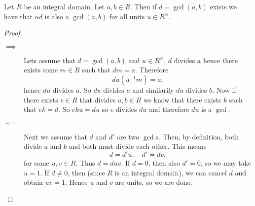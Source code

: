 \begin{lemma}
    Let $R$ be an integral domain. Let $a, b \in R$. Then if $d = \gcd{(a, b)}$ exists we have that $ud$ is also a $\gcd{(a, b)}$ for all units $u \in R^\times$.
\end{lemma}

\begin{proof}
    \begin{description}
        \item[$\implies$] Lets assume that $d = \gcd(a, b)$ and $u \in R^{\times}$. $d$ divides $a$ hence there exists some $m \in R$ such that $dm = a$. Therefore
            \[ du(u^{-1}m) = a; \]
            hence $du$ divides $a$. So $du$ divides $a$ and similarily $du$ divides $b$. Now if there exists $e \in R$ that divides $a, b \in R$ we know that there exists $k$ such that $ek = d$. So $eku = du$ so $e$ divides $du$ and therefore $du$ is a $\gcd$.
        \item[$\impliedby$] Next we assume that $d$ and $d'$ are two $\gcd$s. Then, by definition, both divide $a$ and $b$ and both must divide each other. This means
            \[ d = d'u,\quad d' = dv, \]
            for some $u, v \in R$. Thus $d = duv$. If $d = 0$, then also $d' = 0$, so we may take $u = 1$. If $d \neq 0$, then (since $R$ is an integral domain), we can cancel $d$ and obtain $uv = 1$. Hence $u$ and $v$ are units, so we are done.
    \end{description}
\end{proof}
